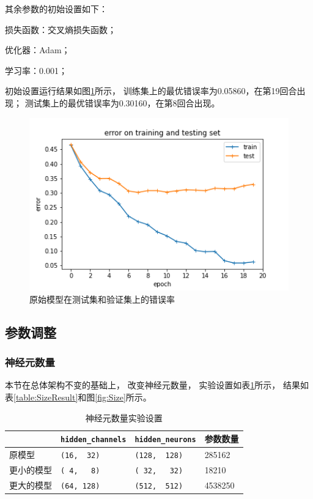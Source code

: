 \documentclass{article}
\begin{document}
其余参数的初始设置如下：

损失函数：交叉熵损失函数；

优化器：Adam；

学习率：0.001；

初始设置运行结果如图\ref{fig:Original}所示，
训练集上的最优错误率为0.05860，在第19回合出现；
测试集上的最优错误率为0.30160，在第8回合出现。

\begin{figure}[h]
\includegraphics[width=\textwidth]
{Result/NN Original 0.001/figure.png}
\caption{原始模型在测试集和验证集上的错误率}
\label{fig:Original}
\end{figure}

\subsection{参数调整}

\subsubsection{神经元数量}

本节在总体架构不变的基础上，
改变神经元数量，
实验设置如表\ref{table:SizeSet}所示，
结果如表\ref{table:SizeResult}和图\ref{fig:Size}所示。

\begin{table}[h]
\centering
\begin{tabular}{|l|l|l|l|} 
\hline
& \verb|hidden_channels| & \verb|hidden_neurons| & 参数数量\\
\hline
原模型 & \verb|(16,  32)| & \verb|(128,  128)| & 285162 \\
更小的模型 & \verb|( 4,   8)| & \verb|( 32,   32)| & 18210 \\
更大的模型 & \verb|(64, 128)| & \verb|(512,  512)| & 4538250\\
\hline
\end{tabular}
\caption{神经元数量实验设置}
\label{table:SizeSet}
\end{table}
\end{document}
